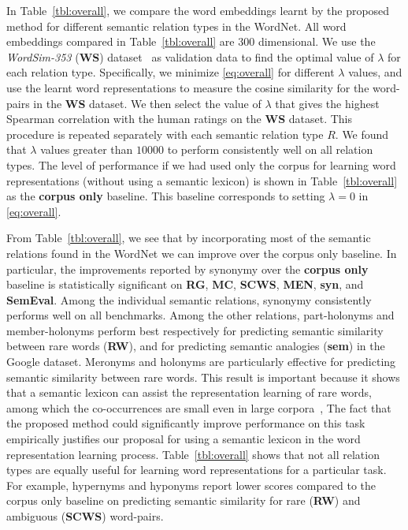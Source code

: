 \documentclass[letterpaper]{article}
\newcommand{\citep}{\cite}
\begin{document}
In Table~\ref{tbl:overall}, we compare the word embeddings learnt by the proposed method for different semantic relation
types in the WordNet.
All word embeddings compared in Table~\ref{tbl:overall} are $300$ dimensional.
We use the \emph{WordSim-353} (\textbf{WS}) dataset~\citep{Finklestein:02}
as validation data to find the optimal value of $\lambda$ for each relation type.
Specifically, we minimize \eqref{eq:overall} for different $\lambda$ values,
and use the learnt word representations to measure the cosine similarity for the word-pairs in the \textbf{WS} dataset.
We then select the value of $\lambda$ that gives the highest Spearman correlation
with the human ratings on the \textbf{WS} dataset. This procedure is repeated separately with each semantic relation type $R$.
We found that $\lambda$ values greater than $10000$ to perform consistently well on all relation types.
The level of performance if we had used only the corpus for learning word representations (without using a semantic lexicon)
 is shown in Table~\ref{tbl:overall} as the \textbf{corpus only} baseline.
This baseline corresponds to setting $\lambda = 0$ in \eqref{eq:overall}.

From Table~\ref{tbl:overall}, we see that by incorporating most of the semantic relations found in the WordNet we can
improve over the corpus only baseline.
In particular, the improvements reported by synonymy over the \textbf{corpus only} baseline is statistically significant on \textbf{RG},
\textbf{MC}, \textbf{SCWS}, \textbf{MEN}, \textbf{syn}, and \textbf{SemEval}.
Among the individual semantic relations, synonymy consistently performs well on all benchmarks.
Among the other relations, part-holonyms and member-holonyms perform best respectively for predicting semantic similarity
between rare words (\textbf{RW}), and for predicting semantic analogies (\textbf{sem}) in the Google dataset.
Meronyms and holonyms are particularly effective for predicting semantic similarity between rare words.
This result is important because it shows that a semantic lexicon can assist the
representation learning of rare words, among which the co-occurrences are small even in large corpora~\citep{Luong:CoNLL:2013},
The fact that the proposed method could significantly improve performance on this task
empirically justifies our proposal for using a semantic lexicon in the word representation learning process.
Table~\ref{tbl:overall} shows that not all relation types are equally useful for learning word representations for a particular task.
For example, hypernyms and hyponyms report lower scores compared to the corpus only baseline on
predicting semantic similarity for rare (\textbf{RW}) and ambiguous (\textbf{SCWS}) word-pairs.
\end{document}
